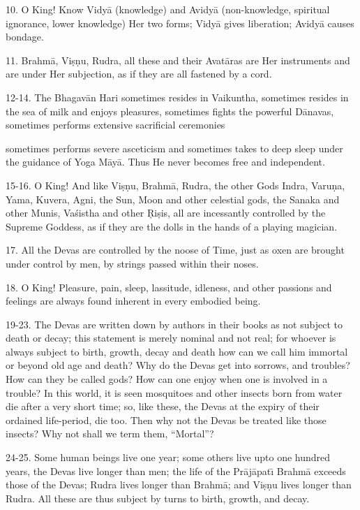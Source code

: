 10. O King! Know Vidy\=a (knowledge) and Avidy\=a (non-knowledge, spiritual ignorance, lower knowledge) Her two forms; Vidy\=a gives liberation; Avidy\=a causes bondage.

11. Brahm\=a, Vi\d{s}\d{n}u, Rudra, all these and their Avat\=aras are Her instruments and are under Her subjection, as if they are all fastened by a cord.

12-14. The Bhagav\=an Hari sometimes resides in Vaikuntha, sometimes resides in the sea of milk and enjoys pleasures, sometimes fights the powerful D\=anavas, sometimes performs extensive sacrificial ceremonies

sometimes performs severe asceticism and sometimes takes to deep sleep under the guidance of Yoga M\=ay\=a. Thus He never becomes free and independent.

15-16. O King! And like Vi\d{s}\d{n}u, Brahm\=a, Rudra, the other Gods Indra, Varu\d{n}a, Yama, Kuvera, Agni, the Sun, Moon and other celestial gods, the Sanaka and other Munis, Va\'sistha and other \d{R}i\d{s}is, all are incessantly controlled by the Supreme Goddess, as if they are the dolls in the hands of a playing magician.

17. All the Devas are controlled by the noose of Time, just as oxen are brought under control by men, by strings passed within their noses.

18. O King! Pleasure, pain, sleep, lassitude, idleness, and other passions and feelings are always found inherent in every embodied being.

19-23. The Devas are written down by authors in their books as not subject to death or decay; this statement is merely nominal and not real; for whoever is always subject to birth, growth, decay and death how can we call him immortal or beyond old age and death? Why do the Devas get into sorrows, and troubles? How can they be called gods? How can one enjoy when one is involved in a trouble? In this world, it is seen mosquitoes and other insects born from water die after a very short time; so, like these, the Devas at the expiry of their ordained life-period, die too. Then why not the Devas be treated like those insects? Why not shall we term them, ``Mortal''?

24-25. Some human beings live one year; some others live upto one hundred years, the Devas live longer than men; the life of the Pr\=aj\=apat\={\i} Brahm\=a exceeds those of the Devas; Rudra lives longer than Brahm\=a; and Vi\d{s}\d{n}u lives longer than Rudra. All these are thus subject by turns to birth, growth, and decay.

